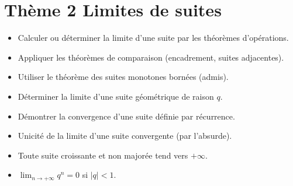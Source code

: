 \documentclass[11pt,a4paper,openany]{book}
\theoremstyle{definition}
\begin{document}
    \section*{Thème 2 \textemdash{} Limites de suites}
    \begin{capacitesbox}
    \begin{itemize}
        \item Calculer ou déterminer la limite d'une suite par les théorèmes
              d'opérations.
        \item Appliquer les théorèmes de comparaison (encadrement, suites
              adjacentes).
        \item Utiliser le théorème des suites monotones bornées (admis).
        \item Déterminer la limite d'une suite géométrique de raison $q$.
        \item Démontrer la convergence d'une suite définie par récurrence.
    \end{itemize}
    \end{capacitesbox}
    \begin{demoprogbox}
    \begin{itemize}
        \item Unicité de la limite d'une suite convergente (par l'absurde).
        \item Toute suite croissante et non majorée tend vers $+\infty$.
        \item $\displaystyle\lim_{n\to+\infty}q^n=0$ si $|q|<1$.
    \end{itemize}
    \end{demoprogbox}

\end{document}
